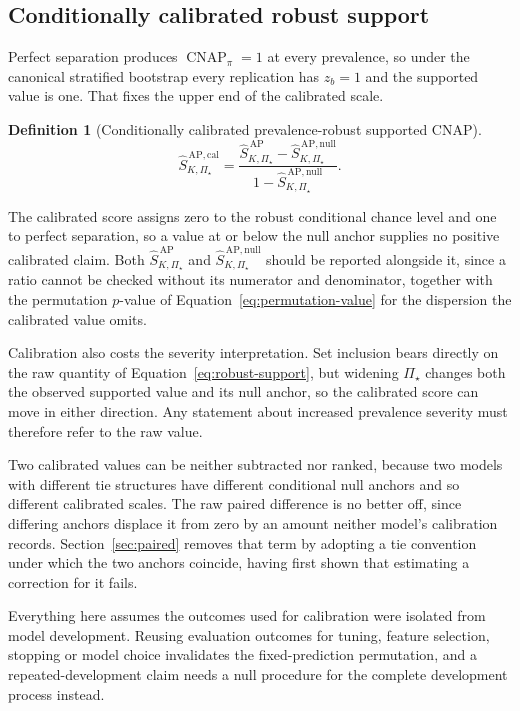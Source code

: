 \documentclass[11pt]{article}
\newcommand{\CNAP}{\operatorname{CNAP}}
\newcommand{\PSet}{\Pi_\star}
\newcommand{\SRobHat}{\widehat S_{K,\PSet}^{\,\mathrm{AP}}}
\newcommand{\SRobNullHat}{\widehat S_{K,\PSet}^{\,\mathrm{AP,null}}}
\newcommand{\SRobCalHat}{\widehat S_{K,\PSet}^{\,\mathrm{AP,cal}}}
\newtheorem{definition}{Definition}
\theoremstyle{remark}
\begin{document}
\subsection{Conditionally calibrated robust support}
\label{sec:calibration-def}

Perfect separation produces $\CNAP_\pi=1$ at every prevalence, so under the canonical stratified bootstrap every replication has $z_b=1$ and the supported value is one. That fixes the upper end of the calibrated scale.

\begin{definition}[Conditionally calibrated prevalence-robust supported CNAP]
\begin{equation}
\SRobCalHat
=
\frac{
\SRobHat-\SRobNullHat
}{
1-\SRobNullHat
}.
\label{eq:robust-calibration}
\end{equation}
\end{definition}

The calibrated score assigns zero to the robust conditional chance level and one to perfect separation, so a value at or below the null anchor supplies no positive calibrated claim. Both $\SRobHat$ and $\SRobNullHat$ should be reported alongside it, since a ratio cannot be checked without its numerator and denominator, together with the permutation $p$-value of Equation~\eqref{eq:permutation-value} for the dispersion the calibrated value omits.

Calibration also costs the severity interpretation. Set inclusion bears directly on the raw quantity of Equation~\eqref{eq:robust-support}, but widening $\PSet$ changes both the observed supported value and its null anchor, so the calibrated score can move in either direction. Any statement about increased prevalence severity must therefore refer to the raw value.

Two calibrated values can be neither subtracted nor ranked, because two models with different tie structures have different conditional null anchors and so different calibrated scales. The raw paired difference is no better off, since differing anchors displace it from zero by an amount neither model's calibration records. Section~\ref{sec:paired} removes that term by adopting a tie convention under which the two anchors coincide, having first shown that estimating a correction for it fails.

Everything here assumes the outcomes used for calibration were isolated from model development. Reusing evaluation outcomes for tuning, feature selection, stopping or model choice invalidates the fixed-prediction permutation, and a repeated-development claim needs a null procedure for the complete development process instead.
\end{document}

